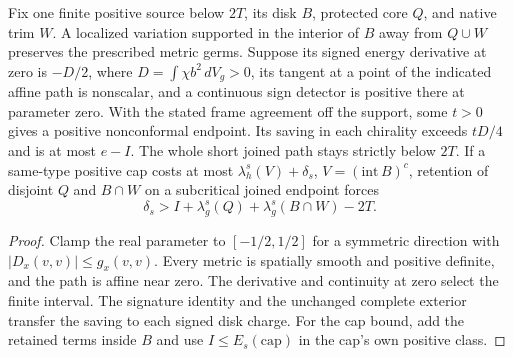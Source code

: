 \begin{theorem}
\label{thm:ed03-signed-first-variation}
\leanok
Fix one finite positive source below $2T$, its disk $B$, protected core
$Q$, and native trim $W$. A localized variation supported in the interior
of $B$ away from $Q\cup W$ preserves the prescribed metric germs.
Suppose its signed energy derivative at zero is $-D/2$,
where $D=\int\chi b^2\,dV_g>0$, its tangent at a point of the indicated
affine path is nonscalar, and a continuous sign detector is positive there
at parameter zero. With the stated frame agreement off the support, some
$t>0$ gives a positive nonconformal endpoint. Its saving in each
chirality exceeds $tD/4$ and is at most $e-I$. The whole short joined path
stays strictly below $2T$. If a same-type positive cap costs at most
$\lambda_h^s(V)+\delta_s$, $V=(\mathrm{int}\,B)^c$, retention of disjoint
$Q$ and $B\cap W$ on a subcritical joined endpoint forces
\[
 \delta_s>I+\lambda_g^s(Q)+\lambda_g^s(B\cap W)-2T .
\]
\end{theorem}
\begin{proof}
\leanok
Clamp the real parameter to $[-1/2,1/2]$ for a symmetric direction
with $|D_x(v,v)|\le g_x(v,v)$. Every metric is spatially smooth and
positive definite, and the path is affine near zero. The derivative
and continuity at zero select the finite interval. The signature identity
and the unchanged complete exterior transfer the saving to each signed
disk charge. For the cap bound, add the retained terms inside $B$ and
use $I\le E_s(\mathrm{cap})$ in the cap's own positive class.
\end{proof}

